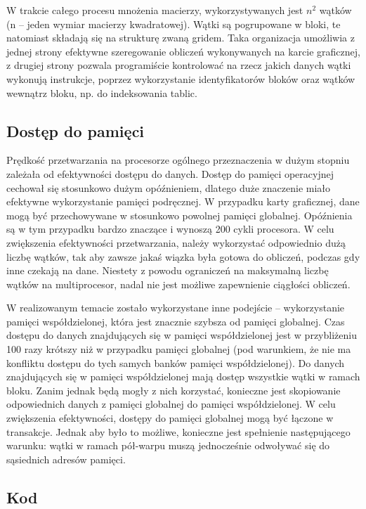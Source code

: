 \documentclass[12pt,a4paper]{article}
\begin{document}
W trakcie całego procesu mnożenia macierzy, wykorzystywanych jest $n^2$ wątków (n -- jeden wymiar macierzy kwadratowej). Wątki są pogrupowane w bloki, te natomiast składają się na strukturę zwaną gridem. Taka organizacja umożliwia z jednej strony efektywne szeregowanie obliczeń wykonywanych na karcie graficznej, z drugiej strony pozwala programiście kontrolować na rzecz jakich danych wątki wykonują instrukcje, poprzez wykorzystanie identyfikatorów bloków oraz wątków wewnątrz bloku, np. do indeksowania tablic.

\subsection{Dostęp do pamięci}

Prędkość przetwarzania na procesorze ogólnego przeznaczenia w dużym stopniu zależała od efektywności dostępu do danych. Dostęp do pamięci operacyjnej cechował się stosunkowo dużym opóźnieniem, dlatego duże znaczenie miało efektywne wykorzystanie pamięci podręcznej.
W przypadku karty graficznej, dane mogą być przechowywane w stosunkowo powolnej pamięci globalnej. Opóźnienia są w tym przypadku bardzo znaczące i wynoszą 200 cykli procesora. W celu zwiększenia efektywności przetwarzania, należy wykorzystać odpowiednio dużą liczbę wątków, tak aby zawsze jakaś wiązka była gotowa do obliczeń, podczas gdy inne czekają na dane. Niestety z powodu ograniczeń na maksymalną liczbę wątków na multiprocesor, nadal nie jest możliwe zapewnienie ciągłości obliczeń.

W realizowanym temacie zostało wykorzystane inne podejście -- wykorzystanie pamięci współdzielonej, która jest znacznie szybsza od pamięci globalnej. Czas dostępu do danych znajdujących się w pamięci współdzielonej jest w przybliżeniu 100 razy krótszy niż w przypadku pamięci globalnej (pod warunkiem, że nie ma konfliktu dostępu do tych samych banków pamięci współdzielonej). Do danych znajdujących się w pamięci współdzielonej mają dostęp wszystkie wątki w ramach bloku. Zanim jednak będą mogły z nich korzystać, konieczne jest skopiowanie odpowiednich danych z pamięci globalnej do pamięci współdzielonej. W celu zwiększenia efektywności, dostępy do pamięci globalnej mogą być łączone w transakcje. Jednak aby było to możliwe, konieczne jest spełnienie następującego warunku: wątki w ramach pół-warpu muszą jednocześnie odwoływać się do sąsiednich adresów pamięci.


\subsection{Kod}
\end{document}
